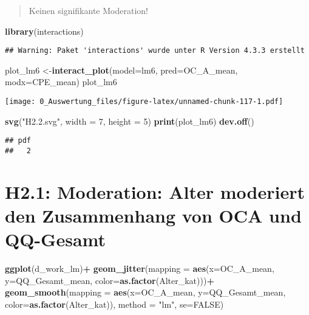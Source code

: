 \documentclass[
]{article}
\newenvironment{Shaded}{\begin{snugshade}}{\end{snugshade}}
\newcommand{\AttributeTok}[1]{\textcolor[rgb]{0.13,0.29,0.53}{#1}}
\newcommand{\ConstantTok}[1]{\textcolor[rgb]{0.56,0.35,0.01}{#1}}
\newcommand{\DecValTok}[1]{\textcolor[rgb]{0.00,0.00,0.81}{#1}}
\newcommand{\FunctionTok}[1]{\textcolor[rgb]{0.13,0.29,0.53}{\textbf{#1}}}
\newcommand{\NormalTok}[1]{#1}
\newcommand{\OtherTok}[1]{\textcolor[rgb]{0.56,0.35,0.01}{#1}}
\newcommand{\SpecialCharTok}[1]{\textcolor[rgb]{0.81,0.36,0.00}{\textbf{#1}}}
\newcommand{\StringTok}[1]{\textcolor[rgb]{0.31,0.60,0.02}{#1}}
\begin{document}
\begin{quote}
Keinen signifikante Moderation!
\end{quote}

\begin{Shaded}
\begin{Highlighting}[]
\FunctionTok{library}\NormalTok{(interactions)}
\end{Highlighting}
\end{Shaded}

\begin{verbatim}
## Warning: Paket 'interactions' wurde unter R Version 4.3.3 erstellt
\end{verbatim}

\begin{Shaded}
\begin{Highlighting}[]
\NormalTok{plot\_lm6 }\OtherTok{\textless{}{-}}\FunctionTok{interact\_plot}\NormalTok{(}\AttributeTok{model=}\NormalTok{lm6, }\AttributeTok{pred=}\NormalTok{OC\_A\_mean, }\AttributeTok{modx=}\NormalTok{CPE\_mean)}
\NormalTok{plot\_lm6}
\end{Highlighting}
\end{Shaded}

\texttt{[image: 0\_Auswertung\_files/figure-latex/unnamed-chunk-117-1.pdf]}

\begin{Shaded}
\begin{Highlighting}[]
\FunctionTok{svg}\NormalTok{(}\StringTok{"H2.2.svg"}\NormalTok{, }\AttributeTok{width =} \DecValTok{7}\NormalTok{, }\AttributeTok{height =} \DecValTok{5}\NormalTok{)}
\FunctionTok{print}\NormalTok{(plot\_lm6)}
\FunctionTok{dev.off}\NormalTok{()}
\end{Highlighting}
\end{Shaded}

\begin{verbatim}
## pdf 
##   2
\end{verbatim}

\section{H2.1: Moderation: Alter moderiert den Zusammenhang von OCA und
QQ-Gesamt}\label{h2.1-moderation-alter-moderiert-den-zusammenhang-von-oca-und-qq-gesamt}

\begin{Shaded}
\begin{Highlighting}[]
\FunctionTok{ggplot}\NormalTok{(d\_work\_lm)}\SpecialCharTok{+}
  \FunctionTok{geom\_jitter}\NormalTok{(}\AttributeTok{mapping =} \FunctionTok{aes}\NormalTok{(}\AttributeTok{x=}\NormalTok{OC\_A\_mean, }\AttributeTok{y=}\NormalTok{QQ\_Gesamt\_mean, }\AttributeTok{color=}\FunctionTok{as.factor}\NormalTok{(Alter\_kat)))}\SpecialCharTok{+}
  \FunctionTok{geom\_smooth}\NormalTok{(}\AttributeTok{mapping =} \FunctionTok{aes}\NormalTok{(}\AttributeTok{x=}\NormalTok{OC\_A\_mean, }\AttributeTok{y=}\NormalTok{QQ\_Gesamt\_mean, }\AttributeTok{color=}\FunctionTok{as.factor}\NormalTok{(Alter\_kat)), }\AttributeTok{method =} \StringTok{"lm"}\NormalTok{, }\AttributeTok{se=}\ConstantTok{FALSE}\NormalTok{)}
\end{Highlighting}
\end{Shaded}
\end{document}
